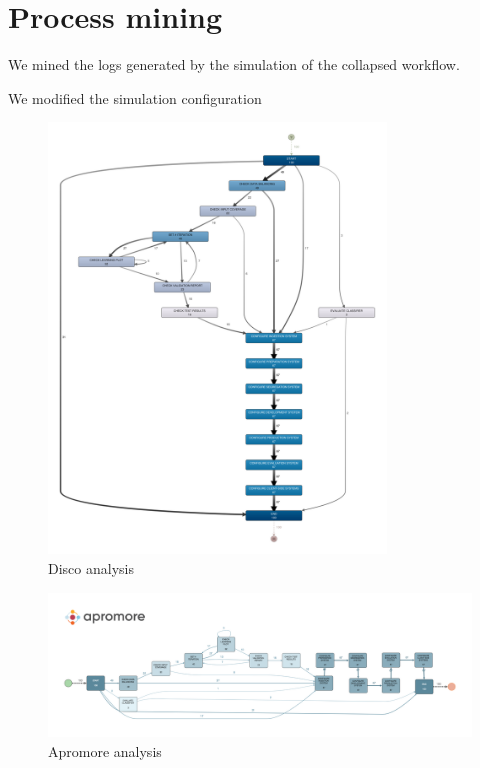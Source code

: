 \section{Process mining}
\label{sec:process_mining}

We mined the logs generated by the simulation of the collapsed workflow.

We modified the simulation configuration 

\begin{figure}[H]
\centering
\includegraphics[width=0.8\textwidth]{figures/disco_map.png}
\caption{Disco analysis}
\label{fig:disco_analysis}
\end{figure}

\begin{figure}[H]
\centering
\includegraphics[width=\textwidth]{figures/apromore_map.png}
\caption{Apromore analysis}
\label{fig:apromore_analysis}
\end{figure}

